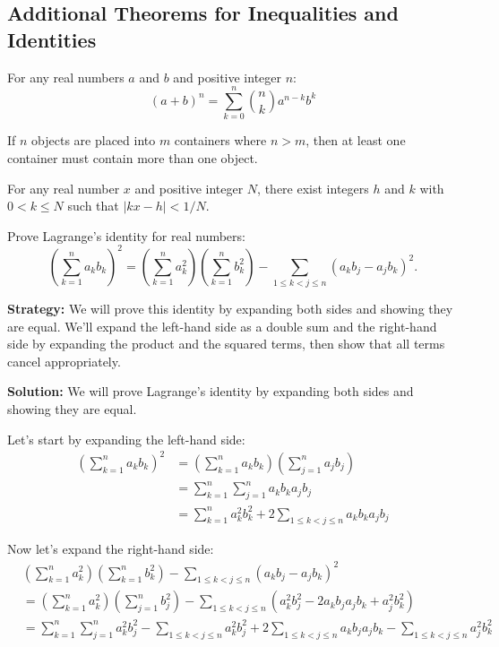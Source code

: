 \subsection*{Additional Theorems for Inequalities and Identities}

\begin{theorem}
For any real numbers $a$ and $b$ and positive integer $n$:
\[
(a + b)^n = \sum_{k=0}^n \binom{n}{k} a^{n-k} b^k
\]
\end{theorem}

\begin{theorem}
If $n$ objects are placed into $m$ containers where $n > m$, then at least one container must contain more than one object.
\end{theorem}

\begin{theorem}
For any real number $x$ and positive integer $N$, there exist integers $h$ and $k$ with $0 < k \leq N$ such that $|kx - h| < 1/N$.
\end{theorem}



\begin{problembox}
Prove Lagrange's identity for real numbers:
\[
\left( \sum_{k=1}^n a_k b_k \right)^2 = \left( \sum_{k=1}^n a_k^2 \right)\left( \sum_{k=1}^n b_k^2 \right) - \sum_{1 \leq k < j \leq n} (a_k b_j - a_j b_k)^2.
\]
\end{problembox}

\noindent\textbf{Strategy:} We will prove this identity by expanding both sides and showing they are equal. We'll expand the left-hand side as a double sum and the right-hand side by expanding the product and the squared terms, then show that all terms cancel appropriately.

\bigskip\noindent\textbf{Solution:}
We will prove Lagrange's identity by expanding both sides and showing they are equal.

Let's start by expanding the left-hand side:
\begin{align*}
\left( \sum_{k=1}^n a_k b_k \right)^2 &= \left( \sum_{k=1}^n a_k b_k \right) \left( \sum_{j=1}^n a_j b_j \right) \\
&= \sum_{k=1}^n \sum_{j=1}^n a_k b_k a_j b_j \\
&= \sum_{k=1}^n a_k^2 b_k^2 + 2 \sum_{1 \leq k < j \leq n} a_k b_k a_j b_j
\end{align*}

Now let's expand the right-hand side:
\begin{align*}
&\left( \sum_{k=1}^n a_k^2 \right)\left( \sum_{k=1}^n b_k^2 \right) - \sum_{1 \leq k < j \leq n} (a_k b_j - a_j b_k)^2 \\
&= \left( \sum_{k=1}^n a_k^2 \right)\left( \sum_{j=1}^n b_j^2 \right) - \sum_{1 \leq k < j \leq n} (a_k^2 b_j^2 - 2a_k b_j a_j b_k + a_j^2 b_k^2) \\
&= \sum_{k=1}^n \sum_{j=1}^n a_k^2 b_j^2 - \sum_{1 \leq k < j \leq n} a_k^2 b_j^2 + 2 \sum_{1 \leq k < j \leq n} a_k b_j a_j b_k - \sum_{1 \leq k < j \leq n} a_j^2 b_k^2
\end{align*}

